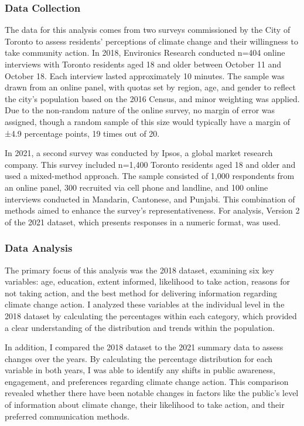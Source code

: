 \documentclass[
  letterpaper,
  DIV=11,
  numbers=noendperiod]{scrartcl}
\begin{document}
\subsubsection{Data Collection}\label{data-collection}

The data for this analysis comes from two surveys commissioned by the
City of Toronto to assess residents' perceptions of climate change and
their willingness to take community action. In 2018, Environics Research
conducted n=404 online interviews with Toronto residents aged 18 and
older between October 11 and October 18. Each interview lasted
approximately 10 minutes. The sample was drawn from an online panel,
with quotas set by region, age, and gender to reflect the city's
population based on the 2016 Census, and minor weighting was applied.
Due to the non-random nature of the online survey, no margin of error
was assigned, though a random sample of this size would typically have a
margin of ±4.9 percentage points, 19 times out of 20.

In 2021, a second survey was conducted by Ipsos, a global market
research company. This survey included n=1,400 Toronto residents aged 18
and older and used a mixed-method approach. The sample consisted of
1,000 respondents from an online panel, 300 recruited via cell phone and
landline, and 100 online interviews conducted in Mandarin, Cantonese,
and Punjabi. This combination of methods aimed to enhance the survey's
representativeness. For analysis, Version 2 of the 2021 dataset, which
presents responses in a numeric format, was used.

\subsubsection{Data Analysis}\label{data-analysis}

The primary focus of this analysis was the 2018 dataset, examining six
key variables: age, education, extent informed, likelihood to take
action, reasons for not taking action, and the best method for
delivering information regarding climate change action. I analyzed these
variables at the individual level in the 2018 dataset by calculating the
percentages within each category, which provided a clear understanding
of the distribution and trends within the population.

In addition, I compared the 2018 dataset to the 2021 summary data to
assess changes over the years. By calculating the percentage
distribution for each variable in both years, I was able to identify any
shifts in public awareness, engagement, and preferences regarding
climate change action. This comparison revealed whether there have been
notable changes in factors like the public's level of information about
climate change, their likelihood to take action, and their preferred
communication methods.
\end{document}
